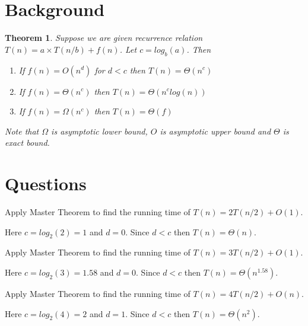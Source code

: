 \documentclass[12pt]{article}
\newtheorem{theorem}{Theorem}
\begin{document}
\section*{Background}

\begin{theorem}
Suppose we are given recurrence relation $T(n) = a \times T(n/b) + f(n)$. Let $c = log_{b}(a)$. Then

\begin{enumerate}
\item If $f(n) = O(n^d)$ for $d < c$ then $T(n) = \Theta(n^c)$
\item If $f(n) = \Theta(n^c)$ then $T(n) = \Theta(n^c log(n))$
\item If $f(n) = \Omega(n^c)$ then $T(n) = \Theta(f)$
\end{enumerate}

Note that $\Omega$ is asymptotic lower bound, $O$ is asymptotic upper bound and $\Theta$ is exact bound.

\end{theorem}

\section*{Questions}

\begin{question}
Apply Master Theorem to find the running time of $T(n) = 2T(n/2) + O(1)$.
\end{question}

\begin{solution}
Here $c = log_{2}(2) = 1$ and $d = 0$. Since $d < c$ then $T(n) = \Theta(n)$.
\end{solution}

\begin{question}
Apply Master Theorem to find the running time of $T(n) = 3T(n/2) + O(1)$.
\end{question}

\begin{solution}
Here $c = log_{2}(3) = 1.58$ and $d = 0$. Since $d < c$ then $T(n) = \Theta(n^{1.58})$.
\end{solution}

\begin{question}
Apply Master Theorem to find the running time of $T(n) = 4T(n/2) + O(n)$.
\end{question}

\begin{solution}
Here $c = log_{2}(4) = 2$ and $d = 1$. Since $d < c$ then $T(n) = \Theta(n^{2})$.
\end{solution}
\end{document}

